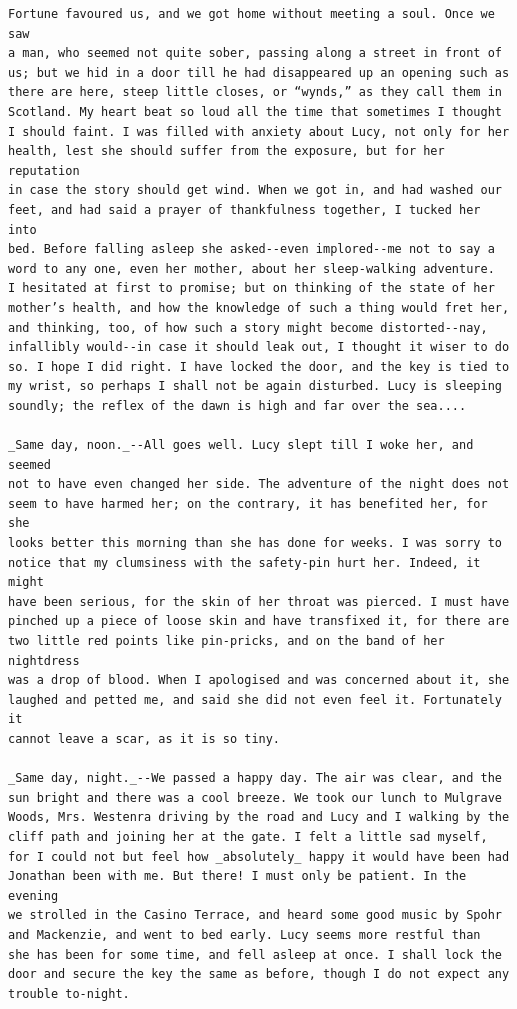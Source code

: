 \documentclass{article}
\begin{document}
\begin{verbatim}
Fortune favoured us, and we got home without meeting a soul. Once we saw
a man, who seemed not quite sober, passing along a street in front of
us; but we hid in a door till he had disappeared up an opening such as
there are here, steep little closes, or “wynds,” as they call them in
Scotland. My heart beat so loud all the time that sometimes I thought
I should faint. I was filled with anxiety about Lucy, not only for her
health, lest she should suffer from the exposure, but for her reputation
in case the story should get wind. When we got in, and had washed our
feet, and had said a prayer of thankfulness together, I tucked her into
bed. Before falling asleep she asked--even implored--me not to say a
word to any one, even her mother, about her sleep-walking adventure.
I hesitated at first to promise; but on thinking of the state of her
mother’s health, and how the knowledge of such a thing would fret her,
and thinking, too, of how such a story might become distorted--nay,
infallibly would--in case it should leak out, I thought it wiser to do
so. I hope I did right. I have locked the door, and the key is tied to
my wrist, so perhaps I shall not be again disturbed. Lucy is sleeping
soundly; the reflex of the dawn is high and far over the sea....

_Same day, noon._--All goes well. Lucy slept till I woke her, and seemed
not to have even changed her side. The adventure of the night does not
seem to have harmed her; on the contrary, it has benefited her, for she
looks better this morning than she has done for weeks. I was sorry to
notice that my clumsiness with the safety-pin hurt her. Indeed, it might
have been serious, for the skin of her throat was pierced. I must have
pinched up a piece of loose skin and have transfixed it, for there are
two little red points like pin-pricks, and on the band of her nightdress
was a drop of blood. When I apologised and was concerned about it, she
laughed and petted me, and said she did not even feel it. Fortunately it
cannot leave a scar, as it is so tiny.

_Same day, night._--We passed a happy day. The air was clear, and the
sun bright and there was a cool breeze. We took our lunch to Mulgrave
Woods, Mrs. Westenra driving by the road and Lucy and I walking by the
cliff path and joining her at the gate. I felt a little sad myself,
for I could not but feel how _absolutely_ happy it would have been had
Jonathan been with me. But there! I must only be patient. In the evening
we strolled in the Casino Terrace, and heard some good music by Spohr
and Mackenzie, and went to bed early. Lucy seems more restful than
she has been for some time, and fell asleep at once. I shall lock the
door and secure the key the same as before, though I do not expect any
trouble to-night.


\end{verbatim}
\end{document}
